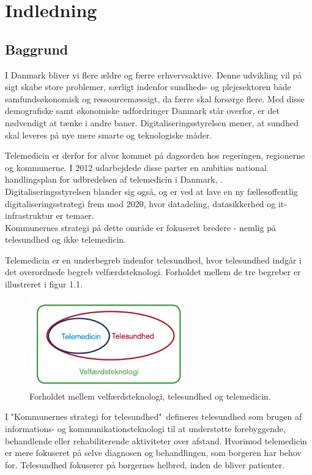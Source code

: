 \chapter{Indledning}

\section{Baggrund}
I Danmark bliver vi flere ældre og færre erhvervsaktive\cite{KL}. Denne udvikling vil på sigt skabe store problemer, særligt indenfor sundheds- og plejesektoren både samfundsøkonomisk og ressourcemæssigt, da færre skal forsørge flere. Med disse demografiske samt økonomiske udfordringer Danmark står overfor, er det nødvendigt at tænke i andre baner. Digitaliseringsstyrelsen mener, at sundhed skal leveres på nye mere smarte og teknologiske måder\cite{Digst}.    
 
 Telemedicin er derfor for alvor kommet på dagsorden hos regeringen, regionerne og kommunerne. I 2012 udarbejdede disse parter en ambitiøs national handlingsplan for udbredelsen af telemedicin i Danmark\cite{Digst}, \cite{NationalH}.\\
Digitaliseringsstyrelsen blander sig også, og er ved at lave en ny fællesoffentlig digitaliseringsstrategi frem mod 2020, hvor datadeling, datasikkerhed og it-infrastruktur er temaer\cite{digst1}. \\
Kommunernes strategi på dette område er fokuseret bredere - nemlig på telesundhed og ikke telemedicin.

Telemedicin er en underbegreb indenfor telesundhed, hvor telesundhed indgår i det overordnede begreb velfærdsteknologi\cite{KLs}. Forholdet mellem de tre begreber er illustreret i figur 1.1. 

\begin{figure}[H]
	\centering
		\caption{Forholdet mellem velfærdsteknologi, telesundhed og telemedicin\cite{KLs}.}
	\includegraphics[width=0.6\textwidth]{Figurer/Snip20160426_6}
\end{figure}

I "Kommunernes strategi for telesundhed"\ defineres telesundhed som brugen af informations- og kommunikationsteknologi til at understøtte forebyggende, behandlende eller rehabiliterende aktiviteter over afstand\cite{KLs}. Hvorimod telemedicin er mere fokuseret på selve diagnosen og behandlingen, som borgeren har behov for. Telesundhed fokuserer på borgernes helbred, inden de bliver patienter\cite{KLs}\cite{sundhed}.

